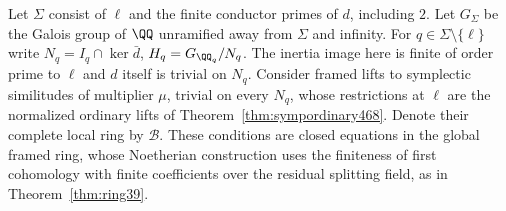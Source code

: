 \documentclass[a4paper,11pt]{article}
\theoremstyle{definition}
\theoremstyle{remark}
\numberwithin{equation}{section}
\begin{document}
Let \(\Sigma\) consist of \(\ell\) and the finite conductor primes
of \(d\), including \(2\). Let \(G_\Sigma\) be the Galois group of
\(\QQ\) unramified away from \(\Sigma\) and infinity. For
\(q\in\Sigma\setminus\{\ell\}\) write
\(N_q=I_q\cap\ker\bar d\), \(H_q=G_{\QQ_q}/N_q\).
The inertia image here is finite of order prime to \(\ell\) and
\(d\) itself is trivial on \(N_q\). Consider framed lifts to
symplectic similitudes of multiplier \(\mu\), trivial on every
\(N_q\), whose restrictions at \(\ell\) are the normalized ordinary
lifts of Theorem~\ref{thm:sympordinary468}. Denote their complete
local ring by \(\mathcal B\). These conditions are closed equations
in the global framed ring, whose Noetherian construction uses the
finiteness of first cohomology with finite coefficients over the
residual splitting field, as in Theorem~\ref{thm:ring39}.
\end{document}
